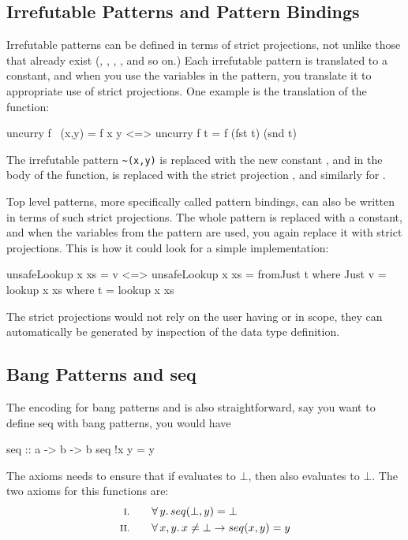 \subsection{Irrefutable Patterns and Pattern Bindings}

Irrefutable patterns can be defined in terms of strict projections,
not unlike those that already exist (, , ,
, and so on.) Each irrefutable pattern is translated to
a constant, and when you use the variables in the pattern, you
translate it to appropriate use of strict projections. One example is
the translation of the  function:

\begin{code}
uncurry f ~(x,y) = f x y    <=>  uncurry f t = f (fst t) (snd t)
\end{code}

\noindent
The irrefutable pattern \verb:~(x,y): is replaced with the new constant
, and in the body of the function,  is replaced with the
strict projection , and similarly for .

Top level patterns, more specifically called pattern bindings, can
also be written in terms of such strict projections. The whole pattern
is replaced with a constant, and when the variables from the pattern
are used, you again replace it with strict projections. This is how it
could look for a simple  implementation:

\begin{code}
unsafeLookup x xs = v           <=>   unsafeLookup x xs = fromJust t
  where Just v = lookup x xs            where t = lookup x xs
\end{code}

The strict projections would not rely on the user having  or
 in scope, they can automatically be generated by
inspection of the data type definition.

\subsection{Bang Patterns and seq}

The encoding for bang patterns and  is also straightforward,
say you want to define seq with bang patterns, you would have

\begin{code}
seq :: a -> b -> b
seq !x y = y
\end{code}

The axioms needs to ensure that if  evaluates to $\bot$, then
 also evaluates to $\bot$. The two axioms for this functions are:
\begin{align*}
\rom{1} \qquad & \fa{y}    seq(\bot,y) \eq \bot \\
\rom{2} \qquad & \faa{x}{y} x \neq \bot \rightarrow seq(x,y) \eq y
\end{align*}

